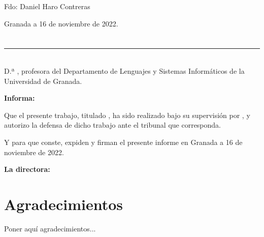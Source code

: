 \vspace{6cm}

\noindent Fdo: Daniel Haro Contreras

\vspace{2cm}

\begin{flushright}
Granada a 16 de noviembre de 2022.
\end{flushright}


\chapter*{}
\thispagestyle{empty}

\noindent\rule[-1ex]{\textwidth}{2pt}\\[4.5ex]

D.ª \textbf{\myProf}, profesora del Departamento de Lenguajes y Sistemas Informáticos de la Universidad de Granada.


\vspace{0.5cm}

\textbf{Informa:}

\vspace{0.5cm}

Que el presente trabajo, titulado \textit{\textbf{\myTitle}},
ha sido realizado bajo su supervisión por \textbf{\myName}, y autorizo la defensa de dicho trabajo ante el tribunal
que corresponda.

\vspace{0.5cm}

Y para que conste, expiden y firman el presente informe en Granada a 16 de noviembre de 2022.

\vspace{1cm}

\textbf{La directora:}

\vspace{5cm}

\noindent \textbf{\myProf}

\chapter*{Agradecimientos}
\thispagestyle{empty}

       \vspace{1cm}


Poner aquí agradecimientos...

